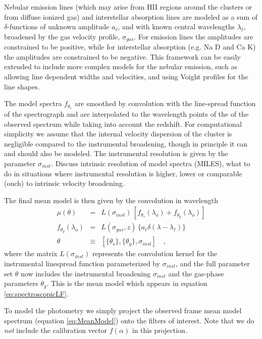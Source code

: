 \documentclass[iop,numberedappendix]{emulateapj}
\begin{document}
Nebular emission lines (which may arise from HII regions around the
clusters or from diffuse ionized gas) and interstellar absorption
lines are modeled as a sum of $\delta$-functions of unknown amplitude
$a_\ell$, and with known central wavelengths $\lambda_\ell$, broadened
by the gas velocity profile, $\sigma_{gas}$.  For emission lines the
amplitudes are constrained to be positive, while for interstellar
absorption (e.g. Na D and Ca K) the amplitudes are constrained to be
negative. This framework can be easily extended to include more
complex models for the nebular emission, such as allowing line
dependent widths and velocities, and using Voight profiles for the
line shapes.

The model spectra $f_{\theta_s}$ are smoothed by convolution with
the line-spread function of the spectrograph and are interpolated to
the wavelength points of the of the observed spectrum while taking
into account the redshift. For computational simplicity we assume that
the internal velocity dispersion of the cluster is negligible compared
to the instrumental broadening, though in principle it can and should
also be modeled. The instrumental resolution is given by the parameter
$\sigma_{inst}$.  {\color{blue}Discuss intrinsic resolution of model spectra
(MILES), what to do in situations where instrumental resolution is
higher, lower or comparable (ouch) to intrinsic velocity broadening.}


The final mean model is then given by the convolution in wavelength
\begin{eqnarray}\label{eq:MeanModel} 
\mu(\theta) &  = & L(\sigma_{inst}) \, \left[ f_{\theta_s}(\lambda_o)
                   + f_{\theta_g}(\lambda_o) \right]\\
f_{\theta_g}(\lambda_o) & = & L(\sigma_{gas}, z) \,  \{a_\ell\delta(\lambda-\lambda_\ell)\}\\
\theta & \equiv & \left[ \{\theta_s\}, \{\theta_{g}\}, \sigma_{inst} \right]
\quad ,
\end{eqnarray}
where the matrix $L(\sigma_{inst})$ represents the convolution kernel
for the instrumental linespread function parameterized by
$\sigma_{inst}$,
and the full parameter set $\theta$ now includes
the instrumental broadening $\sigma_{inst}$ 
and the gas-phase parameters $\theta_g$.
This is the mean model which appears in equation
\ref{eq:spectroscopicLF}.

To model the photometry we simply project the observed frame mean
model spectrum (equation \ref{eq:MeanModel}) onto the filters of
interest.  Note that we do \emph{not} include the calibration vector
$f(\alpha)$ in this projection.
\end{document}
